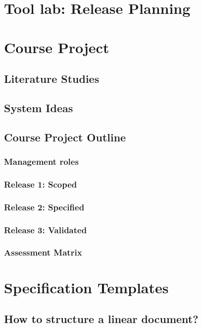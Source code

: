 \documentclass{reqengbook}
\begin{document}
\chapter{Tool lab: Release Planning}

\chapter{Course Project}

\section{Literature Studies}

\section{System Ideas}

\section{Course Project Outline}
\subsection{Management roles}
\subsection{Release 1: Scoped}
\subsection{Release 2: Specified}
\subsection{Release 3: Validated}
\subsection{Assessment Matrix}

\chapter{Specification Templates}

\section{How to structure a linear document?}
\end{document}
